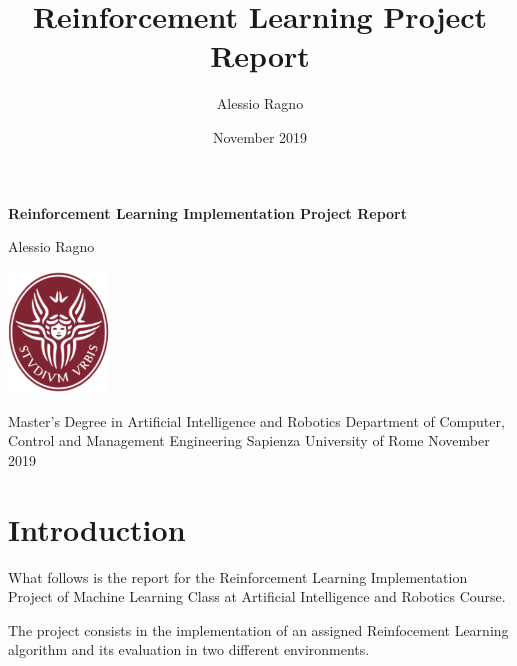 \documentclass[12pt,a4paper]{article}
\author{Alessio Ragno}
\title{Reinforcement Learning Project Report}
\date{November 2019}
\begin{document}

\begin{titlepage}
    \begin{center}
        \vspace*{1cm}
        
        \huge
        \textbf{Reinforcement Learning Implementation Project Report}
        
        
        \vspace{1.5cm}
        \LARGE
        Alessio Ragno
        
        \vfill
        
        \includegraphics[width=0.2\textwidth]{images/sapienza_logo.png}


        
        \vfill
        
  

        \vspace{0.5cm}
        
        
        \large
        Master's Degree in Artificial Intelligence and Robotics\break\break
        Department of Computer, Control and Management Engineering\break\break
        Sapienza University of Rome\break\break
        November 2019

    \end{center}
\end{titlepage}



\pagebreak
\tableofcontents
\pagebreak

\section{Introduction}

What follows is the report for the Reinforcement Learning Implementation Project of Machine Learning Class at Artificial Intelligence and Robotics Course.

The project consists in the implementation of an assigned Reinfocement Learning algorithm and its evaluation in two different environments.
\end{document}
